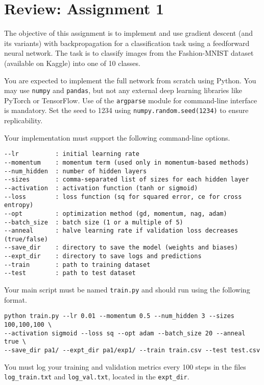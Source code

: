 \chapter*{Review: Assignment 1}\cite{khapra2018deeplearning}

The objective of this assignment is to implement and use gradient descent (and its variants) with backpropagation for a classification task using a feedforward neural network. The task is to classify images from the Fashion-MNIST dataset (available on Kaggle) into one of 10 classes.

You are expected to implement the full network from scratch using Python. You may use \texttt{numpy} and \texttt{pandas}, but not any external deep learning libraries like PyTorch or TensorFlow. Use of the \texttt{argparse} module for command-line interface is mandatory. Set the seed to 1234 using \texttt{numpy.random.seed(1234)} to ensure replicability.

Your implementation must support the following command-line options.
\begin{verbatim}
--lr          : initial learning rate
--momentum    : momentum term (used only in momentum-based methods)
--num_hidden  : number of hidden layers
--sizes       : comma-separated list of sizes for each hidden layer
--activation  : activation function (tanh or sigmoid)
--loss        : loss function (sq for squared error, ce for cross entropy)
--opt         : optimization method (gd, momentum, nag, adam)
--batch_size  : batch size (1 or a multiple of 5)
--anneal      : halve learning rate if validation loss decreases (true/false)
--save_dir    : directory to save the model (weights and biases)
--expt_dir    : directory to save logs and predictions
--train       : path to training dataset
--test        : path to test dataset
\end{verbatim}

Your main script must be named \texttt{train.py} and should run using the following format.
\begin{verbatim}
python train.py --lr 0.01 --momentum 0.5 --num_hidden 3 --sizes 100,100,100 \
--activation sigmoid --loss sq --opt adam --batch_size 20 --anneal true \
--save_dir pa1/ --expt_dir pa1/exp1/ --train train.csv --test test.csv
\end{verbatim}

You must log your training and validation metrics every 100 steps in the files \texttt{log\_train.txt} and \texttt{log\_val.txt}, located in the \texttt{expt\_dir}. 

